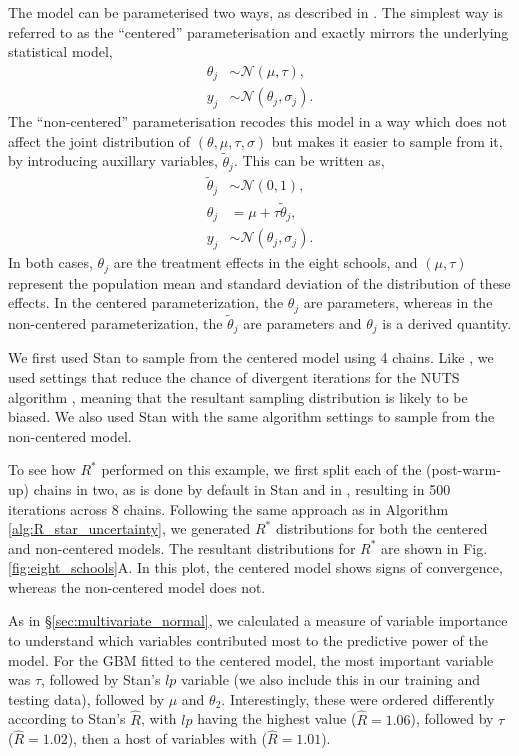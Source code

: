 \documentclass{article}
\newcommand{\N}{\mathcal{N}}
\begin{document}
The model can be parameterised two ways, as described in \cite{vehtari2019rank}. The simplest way is referred to as the ``centered'' parameterisation and exactly mirrors the underlying statistical model,
%
\begin{align*}
\theta_j &\sim \N(\mu, \tau), \\
y_j &\sim \N(\theta_j, \sigma_j).
\end{align*}
%
The ``non-centered'' parameterisation recodes this model in a way which does not affect the joint distribution of $(\theta, \mu, \tau, \sigma)$ but makes it easier to sample from it, by introducing auxillary variables, $\tilde \theta_j$. This can be written as,
%
\begin{align*}
\tilde{\theta}_j &\sim \N(0, 1), \\
\theta_j &= \mu + \tau \tilde{\theta}_j,\\
y_j &\sim \N(\theta_j, \sigma_j).
\end{align*}
%
In both cases, $\theta_j$ are the treatment effects in the eight schools, and $(\mu, \tau)$ represent the population mean and standard deviation 
of the distribution of these effects. In the centered parameterization, the $\theta_j$ are parameters, whereas in the non-centered parameterization, the $\tilde{\theta}_j$ are parameters and $\theta_j$ is a derived quantity.

We first used Stan \citep{carpenter2017stan} to sample from the centered model using 4 chains. Like \cite{vehtari2019rank}, we used settings that reduce the chance of divergent iterations for the NUTS algorithm \citep{hoffman2014no}, meaning that the resultant sampling distribution is likely to be biased. We also used Stan with the same algorithm settings to sample from the non-centered model.

To see how $R^*$ performed on this example, we first split each of the (post-warm-up) chains in two, as is done by default in Stan \citep{carpenter2017stan} and in \cite{vehtari2019rank}, resulting in 500 iterations across 8 chains. Following the same approach as in Algorithm \ref{alg:R_star_uncertainty}, we generated $R^*$ distributions for both the centered and non-centered models. The resultant distributions for $R^*$ are shown in Fig.\ref{fig:eight_schools}A. In this plot, the centered model shows signs of convergence, whereas the non-centered model does not.

As in \S\ref{sec:multivariate_normal}, we calculated a measure of variable importance to understand which variables contributed most to the predictive power of the model. For the GBM fitted to the centered model, the most important variable was $\tau$, followed by Stan's $lp$ variable (we also include this in our training and testing data), followed by $\mu$ and $\theta_2$. Interestingly, these were ordered differently according to Stan's $\widehat{R}$, with $lp$ having the highest value ($\hat R = 1.06$), followed by $\tau$ ($\hat R = 1.02$), then a host of variables with ($\hat R = 1.01$).
\end{document}
